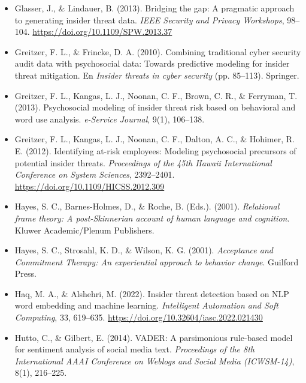 \documentclass[IB]{TFUOC}%
\begin{document}
\begin{itemize}
    \item Glasser, J., \& Lindauer, B. (2013). Bridging the gap: A pragmatic 
    approach to generating insider threat data. \textit{IEEE Security and 
    Privacy Workshops}, 98--104. 
    \url{https://doi.org/10.1109/SPW.2013.37}

    \item Greitzer, F. L., \& Frincke, D. A. (2010). Combining traditional 
    cyber security audit data with psychosocial data: Towards predictive 
    modeling for insider threat mitigation. En \textit{Insider threats in 
    cyber security} (pp. 85--113). Springer.

    \item Greitzer, F. L., Kangas, L. J., Noonan, C. F., Brown, C. R., \& 
    Ferryman, T. (2013). Psychosocial modeling of insider threat risk based 
    on behavioral and word use analysis. \textit{e-Service Journal}, 9(1), 
    106--138.

    \item Greitzer, F. L., Kangas, L. J., Noonan, C. F., Dalton, A. C., \& 
    Hohimer, R. E. (2012). Identifying at-risk employees: Modeling 
    psychosocial precursors of potential insider threats. 
    \textit{Proceedings of the 45th Hawaii International Conference on 
    System Sciences}, 2392--2401. 
    \url{https://doi.org/10.1109/HICSS.2012.309}

    \item Hayes, S. C., Barnes-Holmes, D., \& Roche, B. (Eds.). (2001). \textit{Relational frame theory: A post-Skinnerian account of human language and cognition}. Kluwer Academic/Plenum Publishers.

    \item Hayes, S. C., Strosahl, K. D., \& Wilson, K. G. (2001). \textit{Acceptance and Commitment Therapy: An experiential approach to behavior change}. Guilford Press.

    \item Haq, M. A., \& Alshehri, M. (2022). Insider threat detection based 
    on NLP word embedding and machine learning. \textit{Intelligent Automation 
    and Soft Computing}, 33, 619--635. 
    \url{https://doi.org/10.32604/iasc.2022.021430}

    \item Hutto, C., \& Gilbert, E. (2014). VADER: A parsimonious rule-based 
    model for sentiment analysis of social media text. \textit{Proceedings of 
    the 8th International AAAI Conference on Weblogs and Social Media 
    (ICWSM-14)}, 8(1), 216--225.


\end{itemize}
\end{document}

